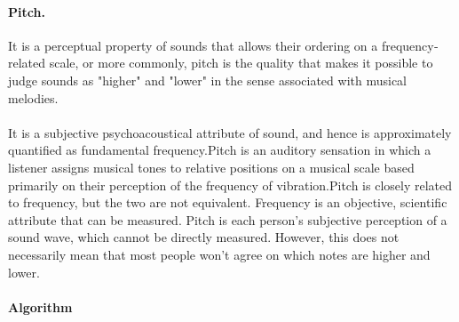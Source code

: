 \paragraph{Pitch.}
It is a perceptual property of sounds that allows their ordering on a frequency­related scale, or 
more commonly, pitch is the quality that makes it possible to judge sounds as "higher" and "lower" in 
the sense associated with musical melodies.\\  
\\
It is a subjective psychoacoustical attribute of sound, and hence is approximately quantified 
as fundamental frequency.Pitch is an auditory sensation in which a listener assigns musical tones to 
relative positions on a musical scale based primarily on their perception of the frequency of 
vibration.Pitch is closely related to frequency, but the two are not equivalent. Frequency is an 
objective, scientific attribute that can be measured. Pitch is each person's subjective perception  of a 
sound wave, which cannot be directly measured. However, this does not necessarily mean that most 
people won't agree on which notes are higher and lower.\\ 
\\
\textbf{Algorithm}
